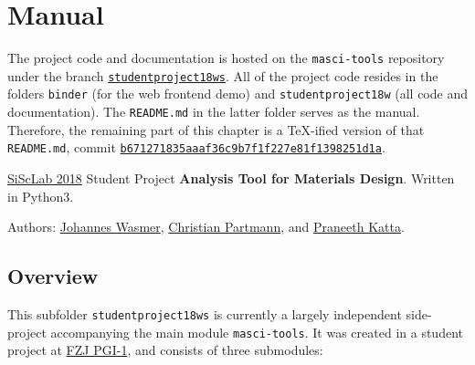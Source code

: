 
\chapter{Manual}
\label{cha:manual}

The project code and documentation is hosted on the \texttt{masci-tools}
repository \cite{masci-tools} under the branch
\href{https://github.com/JuDFTteam/masci-tools/tree/studentproject18ws}{\texttt{studentproject18ws}}.
All of the project code resides in the folders \texttt{binder} (for the web
frontend demo) and \texttt{studentproject18w} (all code and documentation). The
\texttt{README.md} in the latter folder serves as the manual. Therefore, the
remaining part of this chapter is a \TeX{}-ified version of that
\texttt{README.md}, commit
\href{https://github.com/JuDFTteam/masci-tools/tree/b671271835aaaf36c9b7f1f227e81f1398251d1a/studentproject18w}{\texttt{b671271835aaaf36c9b7f1f227e81f1398251d1a}}.

\vspace{3em}
\hdashrule{\textwidth}{2pt}{2pt}

\href{https://www.aices.rwth-aachen.de/en/academics/masters-program-simulation-sciences}{SiScLab
2018} Student Project \textbf{Analysis Tool for Materials
  Design}. Written in Python3.

Authors: \href{https://github.com/Irratzo}{Johannes Wasmer},
\href{https://github.com/ChristianPartmann}{Christian Partmann}, and
\href{https://github.com/PraneethKatta}{Praneeth Katta}.

\section{Overview}\label{overview}

This subfolder \texttt{studentproject18ws} is currently a largely
independent side-project accompanying the main module
\texttt{masci-tools}. It was created in a student project at \href{http://www.fz-juelich.de/pgi/pgi-1/EN/Home/home_node.html}{FZJ PGI-1}, and consists
of three submodules:

